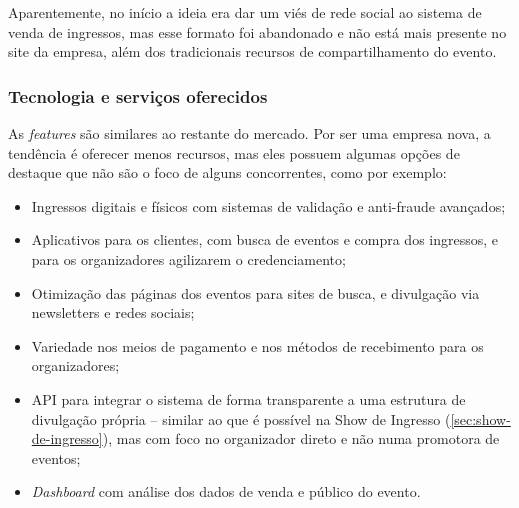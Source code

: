 \documentclass[12pt,a4paper,twoside,hyphens,english,brazil]{abntex2}
\begin{document}
Aparentemente, no início a ideia era dar um viés de rede social ao sistema de venda de ingressos, mas esse formato foi abandonado e não está mais presente no site da empresa, além dos tradicionais recursos de compartilhamento do evento.\cite{ingresse-ig}

\subsubsection*{Tecnologia e serviços oferecidos}
As \emph{features} são similares ao restante do mercado. Por ser uma empresa nova, a tendência é oferecer menos recursos, mas eles possuem algumas opções de destaque que não são o foco de alguns concorrentes, como por exemplo:
\begin{itemize}[itemsep=-1ex]
	\item Ingressos digitais e físicos com sistemas de validação e anti-fraude avançados;
	\item Aplicativos para os clientes, com busca de eventos e compra dos ingressos, e para os organizadores agilizarem o credenciamento;
	\item Otimização das páginas dos eventos para sites de busca, e divulgação via newsletters e redes sociais;
	\item Variedade nos meios de pagamento e nos métodos de recebimento para os organizadores;
	\item API para integrar o sistema de forma transparente a uma estrutura de divulgação própria -- similar ao que é possível na Show de Ingresso (\autoref{sec:show-de-ingresso}), mas com foco no organizador direto e não numa promotora de eventos;
	\item \emph{Dashboard} com análise dos dados de venda e público do evento.
\end{itemize}



\end{document}
